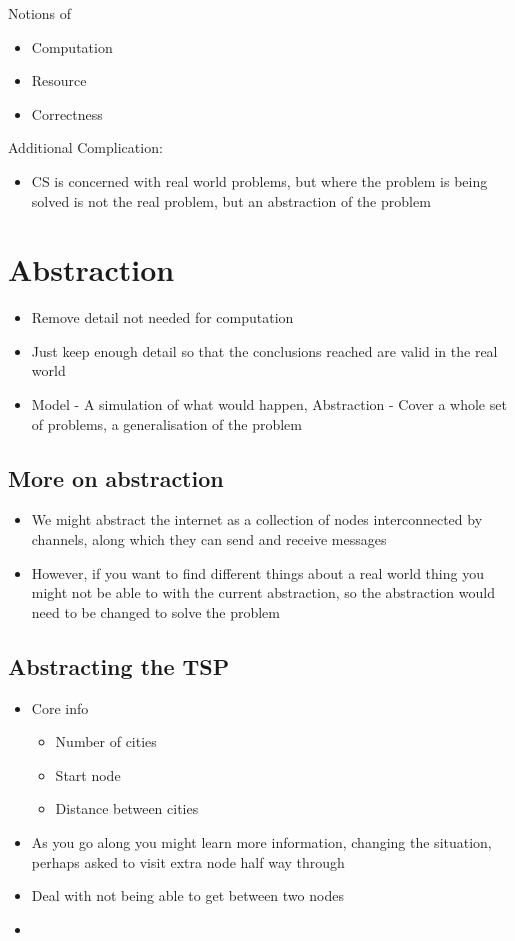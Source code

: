 \documentclass{article}[18pt]
\begin{document}
Notions of
\begin{itemize}
\item Computation
\item Resource
\item Correctness
\end{itemize}


Additional Complication:
\begin{itemize}
\item CS is concerned with real world problems, but where the problem is being solved is not the real problem, but an abstraction of the problem
\end{itemize}
\section{Abstraction}
\begin{itemize}
\item Remove detail not needed for computation
\item Just keep enough detail so that the conclusions reached are valid in the real world
\item Model - A simulation of what would happen, Abstraction - Cover a whole set of problems, a generalisation of the problem
\end{itemize}
\subsection{More on abstraction}
\begin{itemize}
\item We might abstract the internet as a collection of nodes interconnected by channels, along which they can send and receive messages
\item However, if you want to find different things about a real world thing you might not be able to with the current abstraction, so the abstraction would need to be changed to solve the problem
\end{itemize}
\subsection{Abstracting the TSP}
\begin{itemize}
\item Core info
\begin{itemize}
\item Number of cities
\item Start node
\item Distance between cities
\end{itemize}
\item 	As you go along you might learn more information, changing the situation, perhaps asked to visit extra node half way through
\item Deal with not being able to get between two nodes
\item 
\end{itemize}
\end{document}
